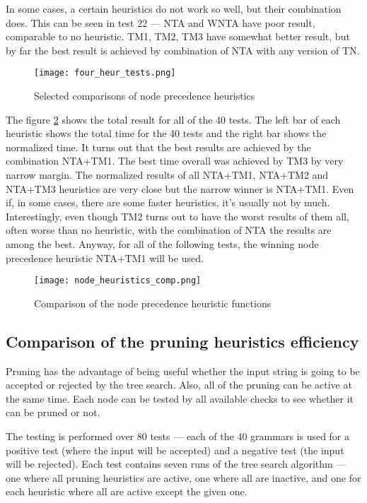 In some cases, a certain heuristics do not work so well, but their combination does. This can be seen in test 22 --- NTA and WNTA have poor result, comparable to no heuristic. TM1, TM2, TM3 have somewhat better result, but by far the best result is achieved by combination of NTA with any version of TN.

\begin{figure}[h!]
  \texttt{[image: four\_heur\_tests.png]}
  \caption{Selected comparisons of node precedence heuristics}
  \label{fig:selected_tests}
\end{figure}

The figure \ref{fig:node_heuristics_comp} shows the total result for all of the 40 tests. The left bar of each heuristic shows the total time for the 40 tests and the right bar shows the normalized time. It turns out that the best results are achieved by the combination NTA+TM1. The best time overall was achieved by TM3 by very narrow margin. The normalized results of all NTA+TM1, NTA+TM2 and NTA+TM3 heuristics are very close but the narrow winner is NTA+TM1. Even if, in some cases, there are some faster heuristics, it's usually not by much. Interestingly, even though TM2 turns out to have the worst results of them all, often worse than no heuristic, with the combination of NTA the results are among the best. Anyway, for all of the following tests, the winning node precedence heuristic NTA+TM1 will be used.

\begin{figure}[h!]
  \texttt{[image: node\_heuristics\_comp.png]}
  \caption{Comparison of the node precedence heuristic functions}
  \label{fig:node_heuristics_comp}
\end{figure}

\subsection{Comparison of the pruning heuristics efficiency} \label{section:pruning_test}

Pruning has the advantage of being useful whether the input string is going to be accepted or rejected by the tree search. Also, all of the pruning can be active at the same time. Each node can be tested by all available checks to see whether it can be pruned or not.

The testing is performed over 80 tests --- each of the 40 grammars is used for a positive test (where the input will be accepted) and a negative test (the input will be rejected).
Each test contains seven runs of the tree search algorithm --- one where all pruning heuristics are active, one where all are inactive, and one for each heuristic where all are active except the given one.

